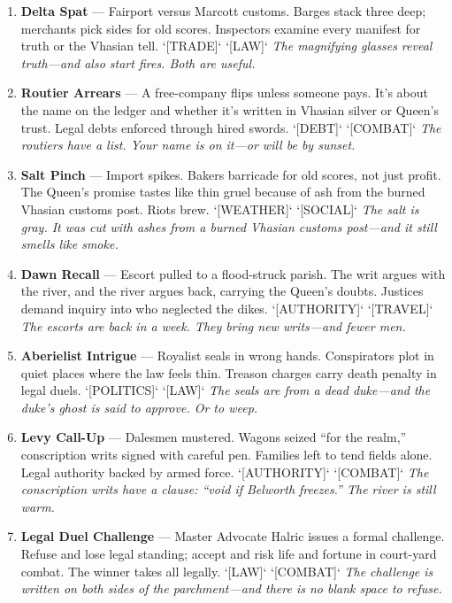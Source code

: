 \begin{enumerate}
\item \textbf{Delta Spat} --- Fairport versus Marcott customs. Barges stack three deep; merchants pick sides for old scores. Inspectors examine every manifest for truth or the Vhasian tell. `[TRADE]` `[LAW]`
  \hfill \textit{The magnifying glasses reveal truth---and also start fires. Both are useful.}
\item \textbf{Routier Arrears} --- A free-company flips unless someone pays. It's about the name on the ledger and whether it's written in Vhasian silver or Queen's trust. Legal debts enforced through hired swords. `[DEBT]` `[COMBAT]`
  \hfill \textit{The routiers have a list. Your name is on it---or will be by sunset.}
\item \textbf{Salt Pinch} --- Import spikes. Bakers barricade for old scores, not just profit. The Queen's promise tastes like thin gruel because of ash from the burned Vhasian customs post. Riots brew. `[WEATHER]` `[SOCIAL]`
  \hfill \textit{The salt is gray. It was cut with ashes from a burned Vhasian customs post---and it still smells like smoke.}
\item[J] \textbf{Dawn Recall} --- Escort pulled to a flood-struck parish. The writ argues with the river, and the river argues back, carrying the Queen's doubts. Justices demand inquiry into who neglected the dikes. `[AUTHORITY]` `[TRAVEL]`
  \hfill \textit{The escorts are back in a week. They bring new writs---and fewer men.}
\item[Q] \textbf{Aberielist Intrigue} --- Royalist seals in wrong hands. Conspirators plot in quiet places where the law feels thin. Treason charges carry death penalty in legal duels. `[POLITICS]` `[LAW]`
  \hfill \textit{The seals are from a dead duke---and the duke's ghost is said to approve. Or to weep.}
\item[K] \textbf{Levy Call-Up} --- Dalesmen mustered. Wagons seized ``for the realm,'' conscription writs signed with careful pen. Families left to tend fields alone. Legal authority backed by armed force. `[AUTHORITY]` `[COMBAT]`
  \hfill \textit{The conscription writs have a clause: ``void if Belworth freezes.'' The river is still warm.}
\item[A] \textbf{Legal Duel Challenge} --- Master Advocate Halric issues a formal challenge. Refuse and lose legal standing; accept and risk life and fortune in court-yard combat. The winner takes all legally. `[LAW]` `[COMBAT]`
  \hfill \textit{The challenge is written on both sides of the parchment---and there is no blank space to refuse.}
\end{enumerate}

